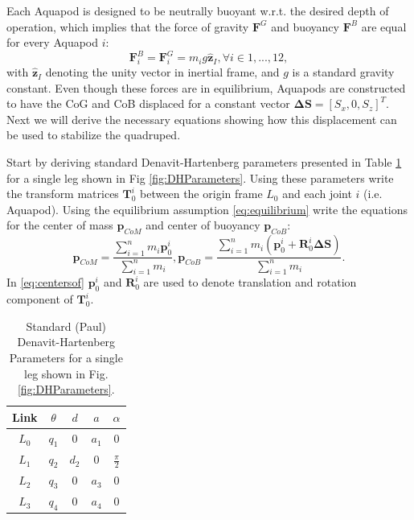 Each Aquapod is designed to be neutrally buoyant w.r.t. the desired depth of operation, which implies that the force of gravity $\textbf{F}^G$ and buoyancy $\textbf{F}^B$ are equal for every Aquapod $i$:
\begin{equation}\label{eq:equilibrium}
\textbf{F}^B_i=\textbf{F}^G_i=m_i g \hat{\textbf{z}}_I, \forall i \in 1,...,12,
\end{equation}
with $\hat{\textbf{z}}_I$ denoting the unity vector in inertial frame, and $g$ is a standard gravity constant. Even though these forces are in equilibrium, Aquapods are constructed to have the CoG and CoB displaced for a constant vector $\boldsymbol{\Delta}\textbf{S}=[S_x, 0, S_z]^T$. Next we will derive the necessary equations showing how this displacement can be used to stabilize the quadruped.

Start by deriving standard Denavit-Hartenberg parameters presented in Table \ref{tab:DHParameters} for a single leg shown in Fig \ref{fig:DHParameters}. Using these parameters write the transform matrices $\textbf{T}_0^i$ between the origin frame $L_0$ and each joint $i$ (i.e. Aquapod). Using the equilibrium assumption \eqref{eq:equilibrium} write the equations for the center of mass $\textbf{p}_{CoM}$ and center of buoyancy $\textbf{p}_{CoB}$:
\begin{equation}\label{eq:centersof}
\textbf{p}_{CoM} = \frac{\sum_{i=1}^n m_i \textbf{p}_0^i}{\sum_{i=1}^n m_i},\textbf{p}_{CoB} = \frac{\sum_{i=1}^n m_i( \textbf{p}_0^i+\textbf{R}_0^i \boldsymbol{\Delta}\textbf{S})}{\sum_{i=1}^n m_i}.
\end{equation} 
In \eqref{eq:centersof}  $\textbf{p}_0^i$ and $\textbf{R}_0^i$ are used to denote translation and rotation component of $\textbf{T}_0^i$.

\begin{table}[!t]
	\centering
	\caption{{Standard (Paul)} Denavit-Hartenberg Parameters for a single leg shown in Fig. \ref{fig:DHParameters}.}\label{tab:DHParameters}
	\begin{tabular}{ccccc}
		Link & $\theta$ & $d$ & $a$ & $\alpha$ \\\hline
		$L_0$ & $q_1$ & $0$ & $a_1$ & $0$\\
		$L_1$ & $q_2$ & $d_2$ & $0$ & $\frac{\pi}{2}$\\
		$L_2$ & $q_3$ & $0$ & $a_3$ & $0$\\
		$L_3$ & $q_4$ & $0$ & $a_4$ & $0$
	\end{tabular}
\end{table}

